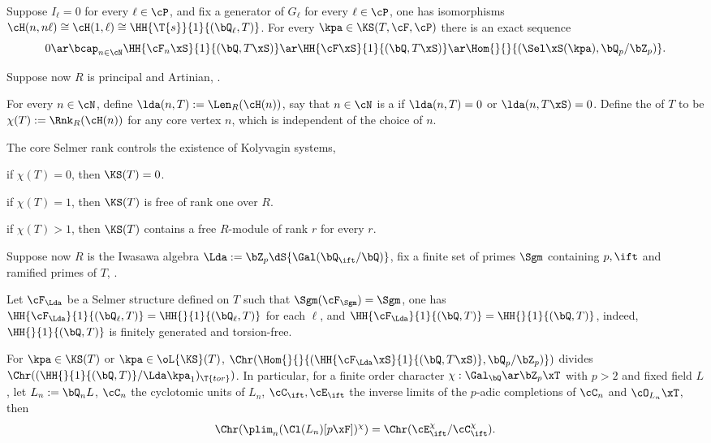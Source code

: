 \documentclass[article, a4paper, twoside]{universal}
\begin{document}
\begin{thm}[3.3.2, 3.3.3]
    Suppose $I_{\ell}=0$ for every $\ell\in\cP$, and fix a generator of $G_{\ell}$ for every $\ell\in\cP$, one has isomorphisms $\cH(n,n\ell)\cong\cH(1,\ell)\cong\HH{\T{s}}{1}{(\bQ_{\ell},T)}$. For every $\kpa\in\KS(T,\cF,\cP)$ there is an exact sequence
    \[
        0\ar\bcap_{n\in\cN}\HH{\cF_{n}\xS}{1}{(\bQ,T\xS)}\ar\HH{\cF\xS}{1}{(\bQ,T\xS)}\ar\Hom{}{}{(\Sel\xS(\kpa),\bQ_{p}/\bZ_{p})}.
    \]
\end{thm}

\begin{stp}
    Suppose now $R$ is principal and Artinian, .
\end{stp}

\begin{dfn}[4.1.2, 4.1.8, 4.10, 4.11]
    For every $n\in\cN$, define $\lda(n,T):=\Len_{R}(\cH(n))$, say that $n\in\cN$ is a  if $\lda(n,T)=0$ or $\lda(n,T\xS)=0$. Define the  of $T$ to be $\chi(T):=\Rnk_{R}(\cH(n))$ for any core vertex $n$, which is independent of the choice of $n$.
\end{dfn}

\begin{thm}[4.2]
    The core Selmer rank controls the existence of Kolyvagin systems,
    \begin{itm}
        \item if $\chi(T)=0$, then $\KS(T)=0$.
        \item if $\chi(T)=1$, then $\KS(T)$ is free of rank one over $R$.
        \item if $\chi(T)>1$, then $\KS(T)$ contains a free $R$-module of rank $r$ for every $r$.
    \end{itm}
\end{thm}

\begin{stp}
    Suppose now $R$ is the Iwasawa algebra $\Lda:=\bZ_{p}\dS{\Gal(\bQ_{\ift}/\bQ)}$, fix a finite set of primes $\Sgm$ containing $p,\ift$ and ramified primes of $T$, .
\end{stp}

\begin{thm}[5.3.2, 5.3.5, 5.3.10, 6.1.9]
    Let $\cF_{\Lda}$ be a Selmer structure defined on $T$ such that $\Sgm(\cF_{\Sgm})=\Sgm$, one has $\HH{\cF_{\Lda}}{1}{(\bQ_{\ell},T)}=\HH{}{1}{(\bQ_{\ell},T)}$ for each $\ell$, and $\HH{\cF_{\Lda}}{1}{(\bQ,T)}=\HH{}{1}{(\bQ,T)}$, indeed, $\HH{}{1}{(\bQ,T)}$ is finitely generated and torsion-free.

    For $\kpa\in\KS(T)$ or $\kpa\in\oL{\KS}(T)$, $\Chr(\Hom{}{}{(\HH{\cF_{\Lda}\xS}{1}{(\bQ,T\xS)},\bQ_{p}/\bZ_{p})})$ divides $\Chr((\HH{}{1}{(\bQ,T)}/\Lda\kpa_{1})_{\T{tor}})$. In particular, for a finite order character $\chi:\Gal_{\bQ}\ar\bZ_{p}\xT$ with $p>2$ and fixed field $L$, let $L_{n}:=\bQ_{n}L$, $\cC_{n}$ the cyclotomic units of $L_{n}$, $\cC_{\ift},\cE_{\ift}$ the inverse limits of the $p$-adic completions of $\cC_{n}$ and $\cO_{L_{n}}\xT$, then
    \[
        \Chr(\plim_{n}(\Cl(L_{n})[p\xF])^{\chi})=\Chr(\cE_{\ift}^{\chi}/\cC_{\ift}^{\chi}).
    \]
\end{thm}


\printref
\end{document}
